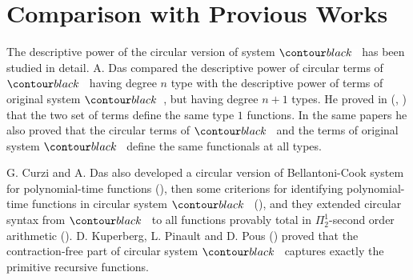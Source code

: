 \section{Comparison with Provious Works}

The descriptive power of the circular version of system $\systemT$ has been studied in detail.
A. Das compared the descriptive power of circular terms of $\systemT$ 
having degree $n$ type with the descriptive power of terms of original system $\systemT$,
but having degree $n+1$ types. 
He  proved in (\cite{2021-Anupam-Das}, \cite{DBLP:conf/fscd/000221})
that the two set of terms define the same type $1$ functions. In the same papers he also proved 
that the circular terms of $\systemT$ and the terms of original system $\systemT$ 
define the same functionals at all types.

G. Curzi and A. Das  also developed a circular version of Bellantoni-Cook system for 
polynomial-time functions (\cite{DBLP:conf/lics/Curzi022}), 
then some criterions for identifying polynomial-time functions
in circular system $\systemT$ (\cite{DBLP:conf/csl/Curzi023}),
and they extended circular syntax from $\systemT$ to all functions provably total in 
$\Pi^1_2$-second order arithmetic (\cite{DBLP:conf/lics/Curzi023}).
D. Kuperberg, L. Pinault and D. Pous (\cite{2021-Kuperberg-Pinault-Pous})
proved that the contraction-free part of circular system $\systemT$
captures exactly the primitive recursive functions.
